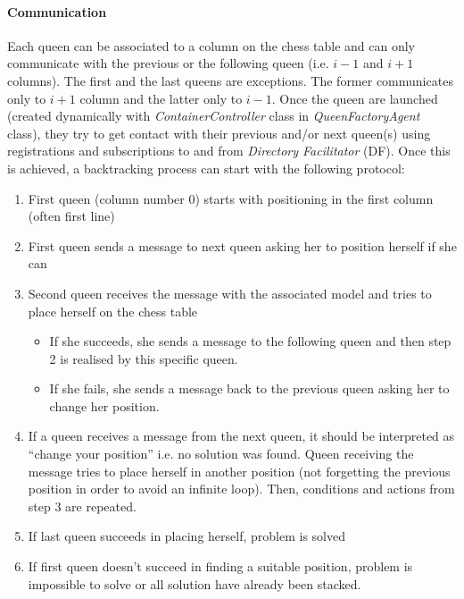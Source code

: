 \documentclass[a4paper,11pt]{article}
\begin{document}
  \paragraph{Communication}  
  Each queen can be associated to a column on the chess table and can only communicate with the previous or the following queen (i.e. $i-1$ and $i+1$ columns). 
  The first and the last queens are exceptions. The former communicates only to $i+1$ column and the latter only to $i-1$. Once the 
  queen are launched (created dynamically with \textit{ContainerController} class in \textit{QueenFactoryAgent} class), they try to get contact with their previous 
  and/or next queen(s) using registrations and subscriptions to and from \textit{Directory Facilitator} (DF). Once this is achieved, a backtracking process 
  can start with the following protocol:
  \begin{enumerate}
   \item First queen (column number 0) starts with positioning in the first column (often first line)
   \item First queen sends a message to next queen asking her to position herself if she can
   \item Second queen receives the message with the associated model and tries to place herself on the chess table
   \begin{itemize}
    \item If she succeeds, she sends a message to the following queen and then step 2 is realised by this specific queen.
    \item If she fails, she sends a message back to the previous queen asking her to change her position.
   \end{itemize}
   \item If a queen receives a message from the next queen, it should be interpreted as ``change your position'' i.e. no solution was found.
   Queen receiving the message tries to place herself in another position (not forgetting the previous position in order 
   to avoid an infinite loop). Then, conditions and actions from step 3 are repeated.
   \item If last queen succeeds in placing herself, problem is solved
   \item If first queen doesn't succeed in finding a suitable position, problem is impossible to solve or all solution have already
   been stacked.
  \end{enumerate}
  
\end{document}
